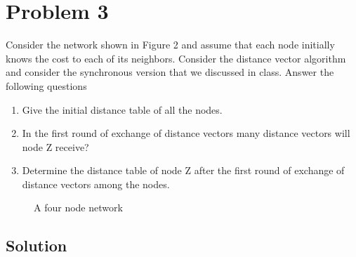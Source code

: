 
\section*{Problem 3}
Consider the network shown in Figure 2 and assume that each node initially knows the cost to each of its neighbors.
Consider the distance vector algorithm and consider the synchronous version that we discussed in class.
Answer the following questions

\begin{enumerate}
      \item Give the initial distance table of all the nodes.
      \item In the first round of exchange of distance vectors many distance vectors will node Z receive?
      \item Determine the distance table of node Z after the first round of exchange of distance vectors among
            the nodes.
\end{enumerate}

\begin{figure}[H]
      \centering
      \caption{A four node network}
\end{figure}

\subsection*{Solution}

